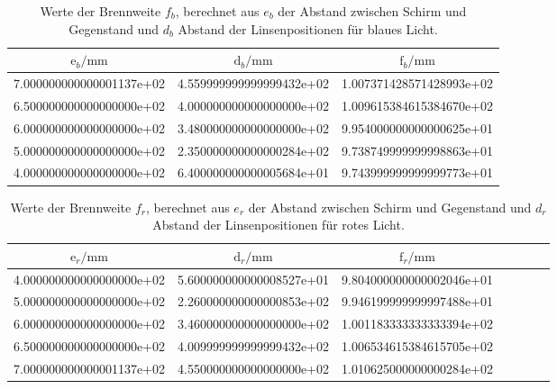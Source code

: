 \begin{table}
  \centering
  \begin{tabular}{S S S}
    \toprule
     $\text{e}_b / \si{\milli\meter}$ &
     $\text{d}_b /\si{\milli\meter} $ & $\text{f}_b / \si{\milli\meter} $\\
    \midrule
    7.000000000000001137e+02 & 4.559999999999999432e+02 & 1.007371428571428993e+02\\
    6.500000000000000000e+02 & 4.000000000000000000e+02 & 1.009615384615384670e+02\\
    6.000000000000000000e+02 & 3.480000000000000000e+02 & 9.954000000000000625e+01\\
    5.000000000000000000e+02 & 2.350000000000000284e+02 & 9.738749999999998863e+01\\
    4.000000000000000000e+02 & 6.400000000000005684e+01 & 9.743999999999999773e+01\\
    \bottomrule
  \end{tabular}
  \caption{Werte der Brennweite \texorpdfstring{$f_b$}{math}, berechnet aus
  \texorpdfstring{$e_b$}{math} der Abstand zwischen Schirm und Gegenstand und
  \texorpdfstring{$d_b$}{math} Abstand der Linsenpositionen für blaues Licht.}
  \label{tab:bb}
\end{table}
\begin{table}
  \centering
  \begin{tabular}{S S S S S S S}
    \toprule
      $\text{e}_r / \si{\milli\meter}$ &
     $\text{d}_r /\si{\milli\meter} $ & $\text{f}_r / \si{\milli\meter} $\\
    \midrule
    4.000000000000000000e+02 & 5.600000000000008527e+01 & 9.804000000000002046e+01\\
    5.000000000000000000e+02 & 2.260000000000000853e+02 & 9.946199999999997488e+01\\
    6.000000000000000000e+02 & 3.460000000000000000e+02 & 1.001183333333333394e+02\\
    6.500000000000000000e+02 & 4.009999999999999432e+02 & 1.006534615384615705e+02\\
    7.000000000000001137e+02 & 4.550000000000000000e+02 & 1.010625000000000284e+02\\
    \bottomrule
  \end{tabular}
  \caption{Werte der Brennweite \texorpdfstring{$f_r$}{math}, berechnet aus
  \texorpdfstring{$e_r$}{math} der Abstand zwischen Schirm und Gegenstand und
  \texorpdfstring{$d_r$}{math} Abstand der Linsenpositionen für rotes Licht.}
  \label{tab:br}
\end{table}




